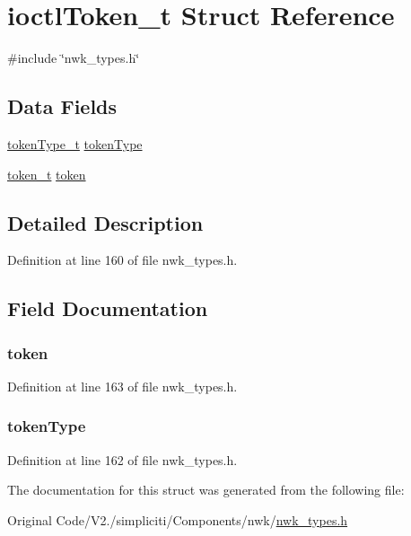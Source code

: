 \hypertarget{structioctlToken__t}{\section{ioctl\-Token\-\_\-t \-Struct \-Reference}
\label{structioctlToken__t}
}


{\ttfamily \#include \char`\"{}nwk\-\_\-types.\-h\char`\"{}}

\subsection*{\-Data \-Fields}
\begin{DoxyCompactItemize}
\item 
\hyperlink{nwk__types_8h_a3369a43c2500da7fabaa8d4b8effb706}{token\-Type\-\_\-t} \hyperlink{structioctlToken__t_a79dabe0f00ed3a1ff15901ad3723f16a}{token\-Type}
\item 
\hyperlink{uniontoken__t}{token\-\_\-t} \hyperlink{structioctlToken__t_a6730f3039f1596a8af51447e361caae5}{token}
\end{DoxyCompactItemize}


\subsection{\-Detailed \-Description}


\-Definition at line 160 of file nwk\-\_\-types.\-h.



\subsection{\-Field \-Documentation}
\hypertarget{structioctlToken__t_a6730f3039f1596a8af51447e361caae5}{
\subsubsection[{token}]{ {\bf token}}}\label{structioctlToken__t_a6730f3039f1596a8af51447e361caae5}


\-Definition at line 163 of file nwk\-\_\-types.\-h.

\hypertarget{structioctlToken__t_a79dabe0f00ed3a1ff15901ad3723f16a}{
\subsubsection[{token\-Type}]{ {\bf token\-Type}}}\label{structioctlToken__t_a79dabe0f00ed3a1ff15901ad3723f16a}


\-Definition at line 162 of file nwk\-\_\-types.\-h.



\-The documentation for this struct was generated from the following file\-:\begin{DoxyCompactItemize}
\item 
\-Original Code/\-V2./simpliciti/\-Components/nwk/\hyperlink{nwk__types_8h}{nwk\-\_\-types.\-h}\end{DoxyCompactItemize}
